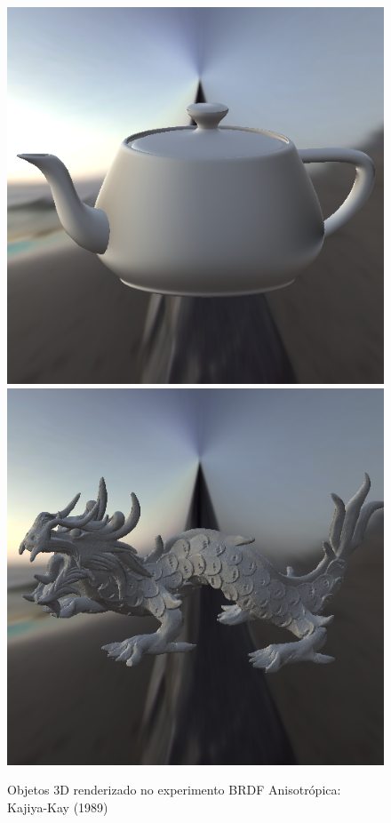 \begin{figure}[H]
    \caption{\small{Objetos 3D renderizado no experimento BRDF Anisotrópica: Kajiya-Kay (1989)}}\label{fig-kajiya-objects}
  \includegraphics[width=\linewidth]{./Imagens/brdfs/aniso-teapot.png}
\endminipage\hfill
{}
  \includegraphics[width=\linewidth]{./Imagens/brdfs/aniso-dragon.png}

\end{figure}
